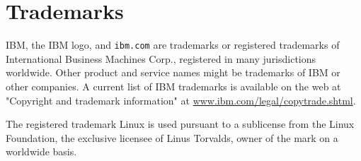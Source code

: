 \section{Trademarks}

IBM, the IBM logo, and \texttt{ibm.com} are trademarks or registered
trademarks of International Business Machines Corp., registered in many
jurisdictions worldwide. Other product and service names might be
trademarks of IBM or other companies. A current list of IBM trademarks is
available on the web at "Copyright and trademark information" at
\url{www.ibm.com/legal/copytrade.shtml}.

The registered trademark Linux\textregistered{} is used pursuant to a
sublicense from the Linux Foundation, the exclusive licensee of Linus
Torvalds, owner of the mark on a world­wide basis.
